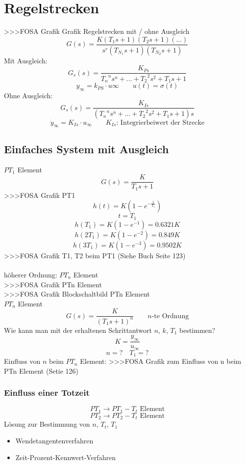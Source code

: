 \section{Regelstrecken}
>>>FOSA Grafik Grafik Regelstrecken mit / ohne Ausgleich
\[ G(s) = \frac{K (T_1 s + 1) (T_2 s + 1) (\ldots)}{s^r (T_{N_1} s + 1) (T_{N_2} s + 1)} \]
Mit Ausgleich: 
\[ G_s(s) = \frac{K_{Ps}}{{T_n}^n s^n + \ldots + {T_2}^2 s^2 + T_1 s + 1} \]
\[ y_\infty = k_{PS} \cdot u\infty \qquad u(t) = \sigma(t) \]
Ohne Ausgleich: 
\[ G_s(s) = \frac{K_{Is}}{({T_n}^n s^n + \ldots + {T_2}^2 s^2 + T_1 s + 1) s} \]
\[ \dot{y}_\infty = K_{Is} \cdot u_\infty \qquad \text{$K_{Is}$: Integrierbeiwert der Strecke} \]

\subsection{Einfaches System mit Ausgleich}
$PT_1$ Element
\[ G(s) = \frac{K}{T_1 s + 1} \]
>>>FOSA Grafik PT1
\[ h(t) = K \left(1 - e^{-\frac{t}{T_1}}\right) \]
\[ t = T_1 \]
\[ h(  T_1) = K \left( 1 - e^{-1} \right) = 0.6321 K \]
\[ h(2 T_1) = K \left( 1 - e^{-2} \right) = 0.849 K \]
\[ h(3 T_1) = K \left( 1 - e^{-3} \right) = 0.9502 K \]
>>>FOSA Grafik T1, T2 beim PT1 (Siehe Buch Seite 123)
\\\\
höherer Ordnung: $PT_n$ Element\\
>>>FOSA Grafik PTn Element\\
>>>FOSA Grafik Blockschaltbild PTn Element\\
$PT_n$ Element
\[ G(s) = \frac{K}{(T_1 s + 1)^n} \qquad \text{$n$-te Ordnung} \]
Wie kann man mit der erhaltenen Schrittantwort $n$, $k$, $T_1$ bestimmen? 
\[ K = \frac{y_\infty}{u_\infty} \]
\[ n = ? \quad T_1 = ? \]
Einfluss von $n$ beim $PT_n$ Element: 
>>>FOSA Grafik zum Einfluss von n beim PTn Element (Setie 126)

\subsubsection{Einfluss einer Totzeit}
\[ PT_1 \rightarrow PT_1 - T_t \text{ Element} \]
\[ PT_2 \rightarrow PT_2 - T_t \text{ Element} \]
Lösung zur Bestimmung von $n$, $T_t$, $T_1$ 
\begin{itemize}
    \item Wendetangentenverfahren
    \item Zeit-Prozent-Kennwert-Verfahren
\end{itemize}

